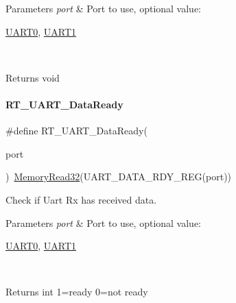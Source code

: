 \begin{DoxyParams}{Parameters}
{\em port} & Port to use, optional value\+:
\begin{DoxyCode}
\mbox{\hyperlink{a00098_a0508661f121639ffdee7de2353a0def2}{UART0}}, \mbox{\hyperlink{a00098_a8d69bf04d07af4fbbab5a8bd291f65ff}{UART1}}
\end{DoxyCode}
 \\
\hline
\end{DoxyParams}
\begin{DoxyReturn}{Returns}
void 
\end{DoxyReturn}
\mbox{\label{a00098_abd2a573ae35e4f6381f9f9758a12806b}} 
\paragraph{\texorpdfstring{R\+T\+\_\+\+U\+A\+R\+T\+\_\+\+Data\+Ready}{RT\_UART\_DataReady}}
{\footnotesize\ttfamily \#define R\+T\+\_\+\+U\+A\+R\+T\+\_\+\+Data\+Ready(\begin{DoxyParamCaption}\item[{}]{port }\end{DoxyParamCaption})~\mbox{\hyperlink{a00026_a2d484dc15bdf30ee11ab3b05f31f0e16}{Memory\+Read32}}(U\+A\+R\+T\+\_\+\+D\+A\+T\+A\+\_\+\+R\+D\+Y\+\_\+\+R\+EG(port))}



Check if Uart Rx has received data. 


\begin{DoxyParams}{Parameters}
{\em port} & Port to use, optional value\+:
\begin{DoxyCode}
\mbox{\hyperlink{a00098_a0508661f121639ffdee7de2353a0def2}{UART0}}, \mbox{\hyperlink{a00098_a8d69bf04d07af4fbbab5a8bd291f65ff}{UART1}}
\end{DoxyCode}
 \\
\hline
\end{DoxyParams}
\begin{DoxyReturn}{Returns}
int 1=ready 0=not ready 
\end{DoxyReturn}
\mbox{\label{a00098_a74f1bca1f0b60eeec1f84bcba3e34919}} 
